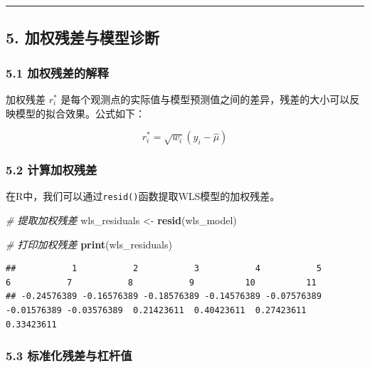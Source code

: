 \documentclass[
  10pt,
]{ctexart}
\newenvironment{Shaded}{\begin{snugshade}}{\end{snugshade}}
\newcommand{\CommentTok}[1]{\textcolor[rgb]{0.56,0.35,0.01}{\textit{#1}}}
\newcommand{\FunctionTok}[1]{\textcolor[rgb]{0.13,0.29,0.53}{\textbf{#1}}}
\newcommand{\NormalTok}[1]{#1}
\newcommand{\OtherTok}[1]{\textcolor[rgb]{0.56,0.35,0.01}{#1}}
\begin{document}
\begin{center}\rule{0.5\linewidth}{0.5pt}\end{center}

\hypertarget{ux52a0ux6743ux6b8bux5deeux4e0eux6a21ux578bux8bcaux65ad}{%
\subsection{5.
加权残差与模型诊断}\label{ux52a0ux6743ux6b8bux5deeux4e0eux6a21ux578bux8bcaux65ad}}

\hypertarget{ux52a0ux6743ux6b8bux5deeux7684ux89e3ux91ca}{%
\subsubsection{5.1
加权残差的解释}\label{ux52a0ux6743ux6b8bux5deeux7684ux89e3ux91ca}}

加权残差 \(r^*_i\)
是每个观测点的实际值与模型预测值之间的差异，残差的大小可以反映模型的拟合效果。公式如下：

\[
r^*_i = \sqrt{w_i}(y_i - \hat{\mu})
\]

\hypertarget{ux8ba1ux7b97ux52a0ux6743ux6b8bux5dee}{%
\subsubsection{5.2
计算加权残差}\label{ux8ba1ux7b97ux52a0ux6743ux6b8bux5dee}}

在R中，我们可以通过\texttt{resid()}函数提取WLS模型的加权残差。

\begin{Shaded}
\begin{Highlighting}[]
\CommentTok{\# 提取加权残差}
\NormalTok{wls\_residuals }\OtherTok{\textless{}{-}} \FunctionTok{resid}\NormalTok{(wls\_model)}

\CommentTok{\# 打印加权残差}
\FunctionTok{print}\NormalTok{(wls\_residuals)}
\end{Highlighting}
\end{Shaded}

\begin{verbatim}
##           1           2           3           4           5           6           7           8           9          10          11 
## -0.24576389 -0.16576389 -0.18576389 -0.14576389 -0.07576389 -0.01576389 -0.03576389  0.21423611  0.40423611  0.27423611  0.33423611
\end{verbatim}

\hypertarget{ux6807ux51c6ux5316ux6b8bux5deeux4e0eux6760ux6746ux503c}{%
\subsubsection{5.3
标准化残差与杠杆值}\label{ux6807ux51c6ux5316ux6b8bux5deeux4e0eux6760ux6746ux503c}}
\end{document}
